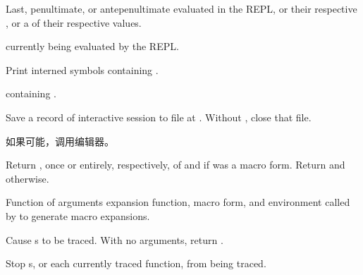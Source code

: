 \begin{LIST}{1cm}
  
  {
  Last, penultimate, or antepenultimate  evaluated in the REPL, or
  their respective , or a  of their respective
  values. 
  }

  \IT{\V*{--}}
  {
   currently being evaluated by the REPL.
  }

  {
  Print interned symbols containing .
  }

  {
   containing .
  }

  {
  Save a record of interactive session to file at . Without
  , close that file.
  }

  {
  如果可能，调用编辑器。
  }

  {
  Return , once or entirely, respectively, of
   and \retvalii{\T} if  was a macro form. 
  Return  and \retvalii{\NIL} otherwise.
  }

  {
  Function of arguments expansion function, macro form, and
  environment called by  to generate macro
  expansions. 
  }

  {
  Cause s to be traced. With no arguments,
  return .
  }

  {
  Stop s, or each currently traced function, from being
  traced. 
  }


\end{LIST}
